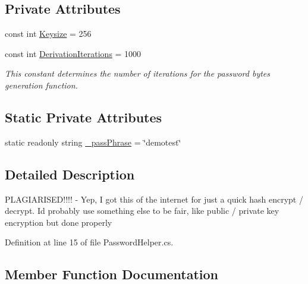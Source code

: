 \subsection*{Private Attributes}
\begin{DoxyCompactItemize}
\item 
const int \hyperlink{class_uni_enrollment___m_v_c_1_1_helpers_1_1_password_helper_adf82ac46ba5e4d73e1177979eb31efc7}{Keysize} = 256
\item 
const int \hyperlink{class_uni_enrollment___m_v_c_1_1_helpers_1_1_password_helper_ae0d57bd52b9f42378589365008ecf1e2}{Derivation\+Iterations} = 1000
\begin{DoxyCompactList}\small\item\em This constant determines the number of iterations for the password bytes generation function. \end{DoxyCompactList}\end{DoxyCompactItemize}
\subsection*{Static Private Attributes}
\begin{DoxyCompactItemize}
\item 
static readonly string \hyperlink{class_uni_enrollment___m_v_c_1_1_helpers_1_1_password_helper_ab934c88f31054cd8f4ecedf645f35182}{\+\_\+pass\+Phrase} = \char`\"{}demotest\char`\"{}
\end{DoxyCompactItemize}


\subsection{Detailed Description}
P\+L\+A\+G\+I\+A\+R\+I\+S\+E\+D!!!! -\/ Yep, I got this of the internet for just a quick hash encrypt / decrypt. I\textquotesingle{}d probably use something else to be fair, like public / private key encryption but done properly 



Definition at line 15 of file Password\+Helper.\+cs.



\subsection{Member Function Documentation}
